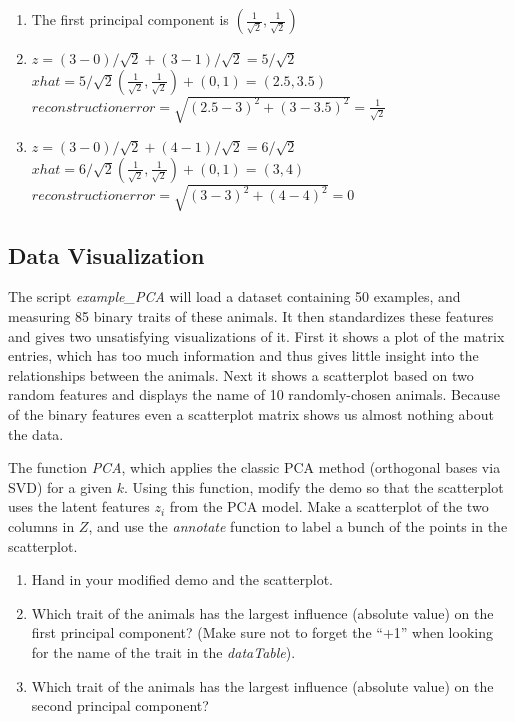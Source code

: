 \documentclass{article}
\def\blu#1{{\color{blu}#1}}
\def\enum#1{\begin{enumerate}#1\end{enumerate}}
\begin{document}
\enum{
\item The first principal component is $(\frac{1}{\sqrt2},\frac{1}{\sqrt2})$
\item $ z = (3-0)/ \sqrt2 +(3-1)/ \sqrt2 = 5/\sqrt2$ \\
        $ xhat = 5/\sqrt2 (\frac{1}{\sqrt2},\frac{1}{\sqrt2}) +(0,1) = (2.5,3.5)$\\
       $ reconstruction error = \sqrt{ (2.5-3)^2+(3-3.5)^2} = \frac{1}{\sqrt2} $
\item $ z = (3-0)/ \sqrt2 +(4-1)/ \sqrt2 = 6/\sqrt2$ \\
        $ xhat = 6/\sqrt2 (\frac{1}{\sqrt2},\frac{1}{\sqrt2}) +(0,1) = (3,4)$\\
       $ reconstruction error = \sqrt{ (3-3)^2+(4-4)^2} = 0 $
}


\subsection{Data Visualization}

The script \emph{example\_PCA} will load a dataset containing 50 examples, and measuring 85 binary traits of these animals. It then standardizes these features and gives two unsatisfying visualizations of it. First it shows a plot of the matrix entries, which has too much information and thus gives little insight into the relationships between the animals. Next it shows a scatterplot based on two random features and displays the name of 10 randomly-chosen animals. Because of the binary features even a scatterplot matrix shows us almost nothing about the data.

The function \emph{PCA}, which applies the classic PCA method (orthogonal bases via SVD) for a given $k$. Using this function, modify the demo so that the scatterplot uses the latent features $z_i$ from the PCA model. Make a scatterplot of the two columns in $Z$, and use the \emph{annotate} function to label a bunch of the points in the scatterplot.
\blu{
\enum{
\item  Hand in your modified demo and the scatterplot.
\item Which trait of the animals has the largest influence (absolute value) on the first principal component? (Make sure not to forget the ``+1'' when looking for the name of the trait in the \emph{dataTable}).
\item Which trait of the animals has the largest influence (absolute value) on the second principal component?
}
}
\end{document}
